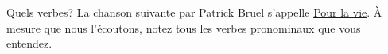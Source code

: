 \begin{frame}{Quels verbes?}
  La chanson suivante par Patrick Bruel s'appelle \href{https://youtu.be/Rglh1je-CrE?si=tLyIEmDT2dIacOfN}{Pour la vie}.
  À mesure que nous l'écoutons, notez tous les verbes pronominaux que vous entendez.
  \begin{columns}
      \begin{center}

      \end{center}
  \end{columns}
\end{frame}